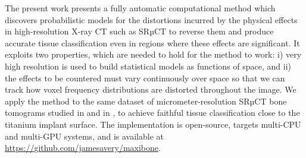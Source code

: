 % 

The present work presents a fully automatic computational method which
discovers probabilistic models for the distortions incurred by the physical
effects in high-resolution X-ray CT such as SRµCT to reverse them and
produce accurate tissue classification even in regions where these effects are
significant. It exploits two properties, which are needed to hold for the
method to work: i) very high resolution is used to build statistical models as
functions of space, and ii) the effects to be countered must vary continuously
over space so that we can track how voxel frequency distributions are distorted
throughout the image. We apply the method to the same dataset of
micrometer-resolution SRµCT bone tomograms studied in \cite{torsten2018}
and in \cite{sporring}, to achieve faithful tissue classification close to the
titanium implant surface. The implementation is open-source, targets multi-CPU
and multi-GPU systems, and is available at
\href{https://github.com/jamesavery/maxibone}
{https://github.com/jamesavery/maxibone}.

